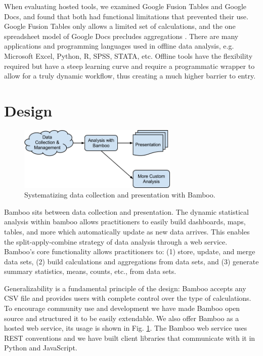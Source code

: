 \documentclass{acm_proc_article-sp}
\begin{document}
When evaluating hosted tools, we examined Google Fusion Tables and Google Docs, and found that both had functional limitations that prevented their use.  Google Fusion Tables only allows a limited set of calculations, and the one spreadsheet model of Google Docs precludes aggregations \cite{gonzalez1, gonzalez2}.  There are many applications and programming languages used in offline data analysis, e.g. Microsoft Excel, Python, R, SPSS, STATA, etc.  Offline tools have the flexibility required but have a steep learning curve and require a programmatic wrapper to allow for a truly dynamic workflow, thus creating a much higher barrier to entry.

\section{Design}

\begin{figure}
\centering
\includegraphics[width=3in]{figures/bamboo_flow}
\caption{Systematizing data collection and presentation with Bamboo.}
\label{fig:flow}
\end{figure}

Bamboo sits between data collection and presentation. The dynamic statistical analysis within bamboo allows practitioners to easily build dashboards, maps, tables, and more which automatically update as new data arrives.  This enables the split-apply-combine strategy of data analysis \cite{wickham} through a web service.  Bamboo’s core functionality allows practitioners to: (1) store, update, and merge data sets, (2) build calculations and aggregations from data sets, and (3) generate summary statistics, means, counts, etc., from data sets.

Generalizability is a fundamental principle of the design: Bamboo accepts any CSV file and provides users with complete control over the type of calculations.  To encourage community use and development we have made Bamboo open source and structured it to be easily extendable.  We also offer Bamboo as a hosted web service, its usage is shown in Fig. \ref{fig:flow}.  The Bamboo web service uses REST conventions and we have built client libraries that communicate with it in Python and JavaScript.
\end{document}
